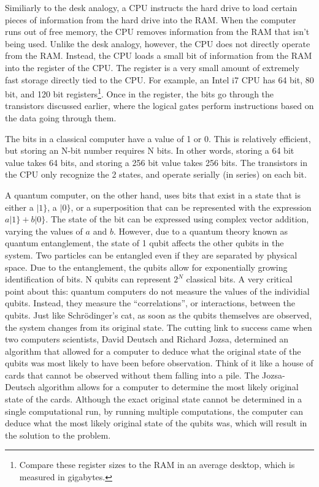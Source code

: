 \documentclass[10pt,journal,compsoc]{IEEEtran}
\begin{document}
Similiarly to the desk analogy, a CPU instructs the hard drive to load certain pieces of information from the hard drive into the RAM. When the computer runs out of free memory, the CPU removes information from the RAM that isn't being used. Unlike the desk analogy, however, the CPU does not directly operate from the RAM. Instead, the CPU loads a small bit of information from the RAM into the register of the CPU. The register is a very small amount of extremely fast storage directly tied to the CPU. For example, an Intel i7 CPU has 64 bit, 80 bit, and 120 bit registers\footnote{Compare these register sizes to the RAM in an average desktop, which is measured in gigabytes.}. Once in the register, the bits go through the transistors discussed earlier, where the logical gates perform instructions based on the data going through them\cite{THPHYS}\cite{Explain}.




The bits in a classical computer have a value of 1 or 0. This is relatively efficient, but storing an N-bit number requires N bits. In other words, storing a 64 bit value takes 64 bits, and storing a 256 bit value takes 256 bits. The transistors in the CPU only recognize the 2 states, and operate serially (in series) on each bit. 

A quantum computer, on the other hand, uses bits that exist in a state that is either a $|1\}$, a $|0\}$, or a superposition that can be represented with the expression $a|1\} + b|0\}$. The state of the bit can be expressed using complex vector addition, varying the values of $a$ and $b$. However, due to a quantum theory known as quantum entanglement, the state of 1 qubit affects the other qubits in the system. Two particles can be entangled even if they are separated by physical space. Due to the entanglement, the qubits allow for exponentially growing identification of bits. N qubits can represent $2^N$ classical bits. A very critical point about this: quantum computers do not measure the values of the individial qubits. Instead, they measure the ``correlations'', or interactions, between the qubits. Just like Schr\"{o}dinger's cat, as soon as the qubits themselves are observed, the system changes from its original state. The cutting link to success came when two computers scientists, David Deutsch and Richard Jozsa, determined an algorithm that allowed for a computer to deduce what the original state of the qubits was most likely to have been before observation. Think of it like a house of cards that cannot be observed without them falling into a pile. The Jozsa-Deutsch algorithm allows for a computer to determine the most likely original state of the cards. Although the exact original state cannot be determined in a single computational run, by running multiple computations, the computer can deduce what the most likely original state of the qubits was, which will result in the solution to the problem\cite{NIST}.
\end{document}
